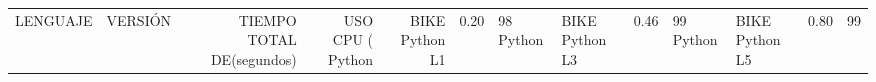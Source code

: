 \begin{tabular}{llrrr}
\toprule
LENGUAJE &        VERSIÓN & TIEMPO TOTAL DE (segundos) & USO CPU (%
\midrule
  Python & BIKE Python L1 &                                  0.20 &         98%
  Python & BIKE Python L3 &                                  0.46 &         99%
  Python & BIKE Python L5 &                                  0.80 &         99%
\bottomrule
\end{tabular}
